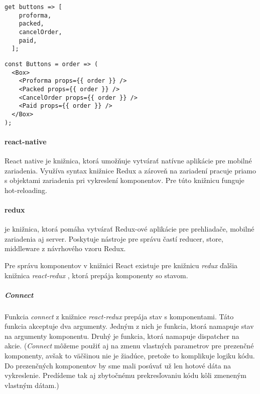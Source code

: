 \begin{lstlisting}[caption=Pole komponentov v Dart-e]
  get buttons => [
    proforma,
    packed,
    cancelOrder,
    paid,
  ];
\end{lstlisting}

\begin{lstlisting}[caption=Pole komponentov v JavaScripte s použitím knižnice React]
const Buttons = order => (
  <Box>
    <Proforma props={{ order }} />
    <Packed props={{ order }} />
    <CancelOrder props={{ order }} />
    <Paid props={{ order }} />
  </Box>
);
\end{lstlisting}

\paragraph{react-native}
React native \cite{ReactNative} je knižnica, ktorá umožňuje vytvárať natívne aplikácie pre mobilné zariadenia. Využíva syntax knižnice Redux a zároveň na zariadení pracuje priamo s objektami zariadenia pri vykreslení komponentov. Pre túto knižnicu funguje hot-reloading.

\paragraph{redux}
\cite[Redux]{redux-lib} je knižnica, ktorá pomáha vytvárať Redux-ové aplikácie pre prehliadače, mobilné zariadenia aj server. Poskytuje nástroje pre správu častí reducer, store, middleware z návrhového vzoru Redux. 

Pre správu komponentov v knižnici React existuje pre knižnicu \emph{redux} ďalšia knižnica \emph{react-redux} \cite{react-redux}, ktorá prepája komponenty so stavom.

\subparagraph{Connect}
\label{func:connect}
Funkcia \emph{connect} z knižnice \emph{react-redux} \cite{react-redux} prepája stav s komponentami. Táto funkcia akceptuje dva argumenty. Jedným z nich je funkcia, ktorá namapuje stav na argumenty komponentu. Druhý je funkcia, ktorá namapuje dispatcher na akcie. %
(\emph{Connect} môžeme použiť aj na zmenu vlastných parametrov pre prezenčné komponenty, avšak to väčšinou nie je žiadúce, pretože to komplikuje logiku kódu. Do prezenčných komponentov by sme mali posúvať už len hotové dáta na vykreslenie. Predídeme tak aj zbytočnému prekresľovaniu kódu kôli zmeneným vlastným dátam.)



